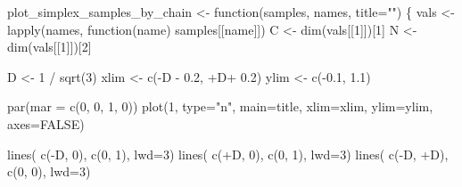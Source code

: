 \documentclass[
  letterpaper,
  DIV=11,
  numbers=noendperiod]{scrartcl}
\newenvironment{Shaded}{\begin{snugshade}}{\end{snugshade}}
\newcommand{\AttributeTok}[1]{\textcolor[rgb]{0.40,0.45,0.13}{#1}}
\newcommand{\ConstantTok}[1]{\textcolor[rgb]{0.56,0.35,0.01}{#1}}
\newcommand{\ControlFlowTok}[1]{\textcolor[rgb]{0.00,0.23,0.31}{#1}}
\newcommand{\DecValTok}[1]{\textcolor[rgb]{0.68,0.00,0.00}{#1}}
\newcommand{\FloatTok}[1]{\textcolor[rgb]{0.68,0.00,0.00}{#1}}
\newcommand{\FunctionTok}[1]{\textcolor[rgb]{0.28,0.35,0.67}{#1}}
\newcommand{\NormalTok}[1]{\textcolor[rgb]{0.00,0.23,0.31}{#1}}
\newcommand{\OtherTok}[1]{\textcolor[rgb]{0.00,0.23,0.31}{#1}}
\newcommand{\SpecialCharTok}[1]{\textcolor[rgb]{0.37,0.37,0.37}{#1}}
\newcommand{\StringTok}[1]{\textcolor[rgb]{0.13,0.47,0.30}{#1}}
\begin{document}
\begin{Shaded}
\begin{Highlighting}[]
\NormalTok{plot\_simplex\_samples\_by\_chain }\OtherTok{\textless{}{-}} \ControlFlowTok{function}\NormalTok{(samples, names, }\AttributeTok{title=}\StringTok{""}\NormalTok{) \{}
\NormalTok{  vals }\OtherTok{\textless{}{-}} \FunctionTok{lapply}\NormalTok{(names, }\ControlFlowTok{function}\NormalTok{(name) samples[[name]])}
\NormalTok{  C }\OtherTok{\textless{}{-}} \FunctionTok{dim}\NormalTok{(vals[[}\DecValTok{1}\NormalTok{]])[}\DecValTok{1}\NormalTok{]}
\NormalTok{  N }\OtherTok{\textless{}{-}} \FunctionTok{dim}\NormalTok{(vals[[}\DecValTok{1}\NormalTok{]])[}\DecValTok{2}\NormalTok{]}

\NormalTok{  D }\OtherTok{\textless{}{-}} \DecValTok{1} \SpecialCharTok{/} \FunctionTok{sqrt}\NormalTok{(}\DecValTok{3}\NormalTok{)}
\NormalTok{  xlim }\OtherTok{\textless{}{-}} \FunctionTok{c}\NormalTok{(}\SpecialCharTok{{-}}\NormalTok{D }\SpecialCharTok{{-}} \FloatTok{0.2}\NormalTok{, }\SpecialCharTok{+}\NormalTok{D}\SpecialCharTok{+} \FloatTok{0.2}\NormalTok{)}
\NormalTok{  ylim }\OtherTok{\textless{}{-}} \FunctionTok{c}\NormalTok{(}\SpecialCharTok{{-}}\FloatTok{0.1}\NormalTok{, }\FloatTok{1.1}\NormalTok{)}

  \FunctionTok{par}\NormalTok{(}\AttributeTok{mar =} \FunctionTok{c}\NormalTok{(}\DecValTok{0}\NormalTok{, }\DecValTok{0}\NormalTok{, }\DecValTok{1}\NormalTok{, }\DecValTok{0}\NormalTok{))}
  \FunctionTok{plot}\NormalTok{(}\DecValTok{1}\NormalTok{, }\AttributeTok{type=}\StringTok{"n"}\NormalTok{, }\AttributeTok{main=}\NormalTok{title,}
       \AttributeTok{xlim=}\NormalTok{xlim, }\AttributeTok{ylim=}\NormalTok{ylim,}
       \AttributeTok{axes=}\ConstantTok{FALSE}\NormalTok{)}

  \FunctionTok{lines}\NormalTok{( }\FunctionTok{c}\NormalTok{(}\SpecialCharTok{{-}}\NormalTok{D, }\DecValTok{0}\NormalTok{),  }\FunctionTok{c}\NormalTok{(}\DecValTok{0}\NormalTok{, }\DecValTok{1}\NormalTok{), }\AttributeTok{lwd=}\DecValTok{3}\NormalTok{)}
  \FunctionTok{lines}\NormalTok{( }\FunctionTok{c}\NormalTok{(}\SpecialCharTok{+}\NormalTok{D, }\DecValTok{0}\NormalTok{),  }\FunctionTok{c}\NormalTok{(}\DecValTok{0}\NormalTok{, }\DecValTok{1}\NormalTok{), }\AttributeTok{lwd=}\DecValTok{3}\NormalTok{)}
  \FunctionTok{lines}\NormalTok{( }\FunctionTok{c}\NormalTok{(}\SpecialCharTok{{-}}\NormalTok{D, }\SpecialCharTok{+}\NormalTok{D), }\FunctionTok{c}\NormalTok{(}\DecValTok{0}\NormalTok{, }\DecValTok{0}\NormalTok{), }\AttributeTok{lwd=}\DecValTok{3}\NormalTok{)}


\end{Highlighting}
\end{Shaded}
\end{document}
